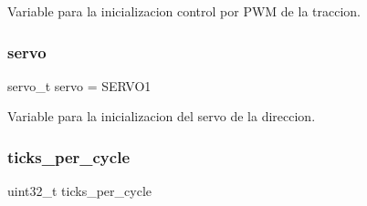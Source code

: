 Variable para la inicializacion control por P\+WM de la traccion. 

\mbox{\label{group__ejemplos_gac9bf31fae1711f00f3a5c93489f20dec}} 
\subsubsection{servo}
{\footnotesize\ttfamily servo\+\_\+t servo = S\+E\+R\+V\+O1}



Variable para la inicializacion del servo de la direccion. 

\mbox{\label{group__ejemplos_ga0d8c58255793ebd1c0d2eed46216d675}} 
\subsubsection{ticks\+\_\+per\+\_\+cycle}
{\footnotesize\ttfamily uint32\+\_\+t ticks\+\_\+per\+\_\+cycle}

